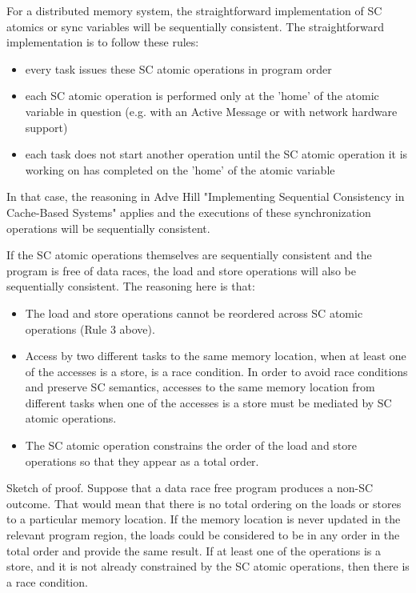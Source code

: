 For a distributed memory system, the straightforward implementation of SC
atomics or sync variables will be sequentially consistent. The straightforward
implementation is to follow these rules:

\begin{itemize}

 \item every task issues these SC atomic operations in program order

 \item each SC atomic operation is performed only at the 'home' of the atomic
 variable in question (e.g. with an Active Message or with network hardware
 support)

 \item each task does not start another operation until the SC atomic operation
 it is working on has completed on the 'home' of the atomic variable

\end{itemize}

In that case, the reasoning in Adve Hill "Implementing Sequential Consistency
in Cache-Based Systems" applies and the executions of these synchronization
operations will be sequentially consistent.

If the SC atomic operations themselves are sequentially consistent and the
program is free of data races, the load and store operations will also be
sequentially consistent. The reasoning here is that:

\begin{itemize}

 \item The load and store operations cannot be reordered across SC atomic
 operations (Rule 3 above).

 \item Access by two different tasks to the same memory location, when at
 least one of the accesses is a store, is a race condition. In order to
 avoid race conditions and preserve SC semantics, accesses to the same
 memory location from different tasks when one of the accesses is a store
 must be mediated by SC atomic operations.

 \item The SC atomic operation constrains the order of the load and store
 operations so that they appear as a total order.
\end{itemize}

Sketch of proof. Suppose that a data race free program produces a non-SC
outcome. That would mean that there is no total ordering on the loads or stores
to a particular memory location. If the memory location is never updated in the
relevant program region, the loads could be considered to be in any order in
the total order and provide the same result. If at least one of the operations
is a store, and it is not already constrained by the SC atomic operations, then
there is a race condition.

